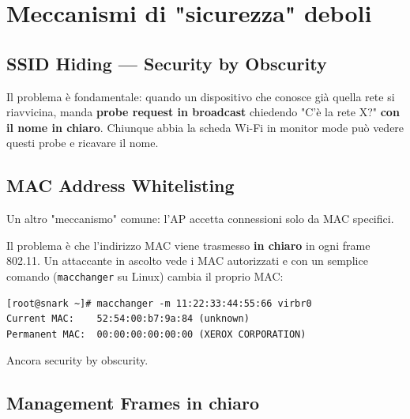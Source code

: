 
\section{Meccanismi di "sicurezza" deboli}

\subsection{SSID Hiding --- Security by Obscurity}


Il problema \`e fondamentale: quando un dispositivo che conosce gi\`a quella rete si riavvicina, manda \textbf{probe request in broadcast} chiedendo "C'\`e la rete X?" \textbf{con il nome in chiaro}. Chiunque abbia la scheda Wi-Fi in monitor mode pu\`o vedere questi probe e ricavare il nome.


\subsection{MAC Address Whitelisting}

Un altro "meccanismo" comune: l'AP accetta connessioni solo da MAC specifici.

Il problema \`e che l'indirizzo MAC viene trasmesso \textbf{in chiaro} in ogni frame 802.11. Un attaccante in ascolto vede i MAC autorizzati e con un semplice comando (\texttt{macchanger} su Linux) cambia il proprio MAC:

\begin{verbatim}
[root@snark ~]# macchanger -m 11:22:33:44:55:66 virbr0
Current MAC:    52:54:00:b7:9a:84 (unknown)
Permanent MAC:  00:00:00:00:00:00 (XEROX CORPORATION)
\end{verbatim}

Ancora security by obscurity.

\subsection{Management Frames in chiaro}

